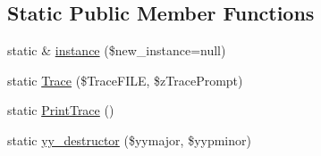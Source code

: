 \subsection*{Static Public Member Functions}
\begin{DoxyCompactItemize}
\item 
static \& \hyperlink{class_smarty___internal___configfileparser_af31b488c68b8389658490fcccb8af0a1}{instance} (\$new\+\_\+instance=null)
\item 
static \hyperlink{class_smarty___internal___configfileparser_a20a25ab18c1b5426baf7dc89069cd3e3}{Trace} (\$Trace\+F\+I\+L\+E, \$z\+Trace\+Prompt)
\item 
static \hyperlink{class_smarty___internal___configfileparser_a27e87f0e845570496a0ee634ecd10976}{Print\+Trace} ()
\item 
static \hyperlink{class_smarty___internal___configfileparser_a60739e78e8ad88d53328416e0fcf5f64}{yy\+\_\+destructor} (\$yymajor, \$yypminor)
\end{DoxyCompactItemize}
